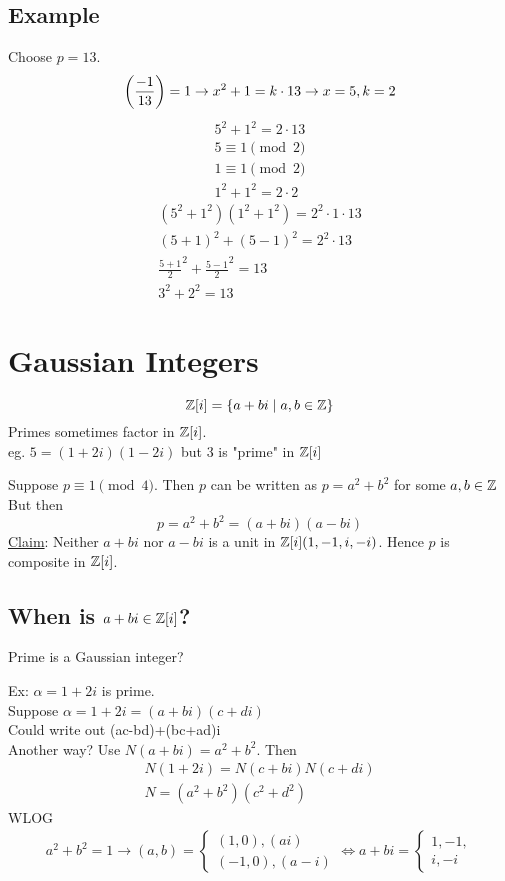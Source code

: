     \subsection{Example}
    Choose $p=13$. 
    \[
        \left( \frac{-1}{13} \right)  = 1 \rightarrow x^2+1=k\cdot 13 \rightarrow x=5,k=2
    \]
    \begin{align*}
        5^2+1^2 = 2\cdot 13 \\
        5\equiv 1\pmod{2} \\
        1\equiv 1\pmod{2} \\
        1^2+1^2 = 2\cdot 2
    \end{align*}
    \begin{align*}
        (5^2+1^2)(1^2+1^2) = 2^2 \cdot 1\cdot 13 \\
        (5+1)^2 + (5-1)^2 = 2^2\cdot 13 \\
        \frac{5+1}{2}^2 + \frac{5-1}{2}^2 = 13 \\
        3^2 + 2^2 = 13
    \end{align*}
        
\section{Gaussian Integers}
    \[
        \mathbb{Z}[i] = \{ a+bi\mid a,b\in\mathbb{Z} \}
    \]
    Primes sometimes factor in $\mathbb{Z}[i]$. \\
    eg. $5=(1+2i)(1-2i)$ but 3 is "prime" in $\mathbb{Z}[i]$ 

    Suppose $p\equiv 1\pmod{4}$. Then $p$ can be written as $p=a^2+b^2$
    for some $a,b\in\mathbb{Z}$ But then 
    \[
        p=a^2+b^2 = (a+bi)(a-bi)
    \]
    \underline{Claim}: Neither $a+bi$ nor $a-bi$ is a unit in $\mathbb{Z}[i] (1,-1,i,-i)$.
    Hence $p$ is composite in $\mathbb{Z}[i]$. 

    \subsection{When is $a+bi\in\mathbb{Z}[i]$?}
    Prime is a Gaussian integer?
    
    Ex: $\alpha = 1+2i$ is prime. \\
    Suppose $\alpha = 1+2i = (a+bi)(c+di)$ \\
    Could write out (ac-bd)+(bc+ad)i \\

    Another way? Use $N(a+bi) = a^2+b^2$. 
    Then 
    \begin{align*}
        N(1+2i) = N(c+bi)N(c+di) \\
        N = (a^2+b^2)(c^2+d^2)
    \end{align*}
    WLOG
    \begin{align*}
        a^2+b^2 = 1 \rightarrow (a,b) = 
        \begin{cases}
            (1,0),(ai) \\
            (-1,0),(a-i)
        \end{cases}
        \Longleftrightarrow a+bi = 
        \begin{cases}
            1, -1, \\
            i, -i
        \end{cases}
    \end{align*}

